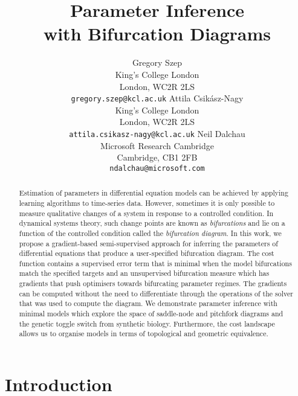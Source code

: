 

\title{Parameter Inference\\with Bifurcation Diagrams}
\author{
        Gregory Szep\\King's College London\\London, WC2R 2LS\\
        \texttt{gregory.szep@kcl.ac.uk}
    \And
        Attila Csik\'asz-Nagy\\King's College London\\London, WC2R 2LS\\
        \texttt{attila.csikasz-nagy@kcl.ac.uk}
    \And
        Neil Dalchau\\Microsoft Research Cambridge\\Cambridge, CB1 2FB\\
        \texttt{ndalchau@microsoft.com}
}



\maketitle
\begin{abstract}
    Estimation of parameters in differential equation models can be achieved by applying learning algorithms to time-series data. However, sometimes it is only possible to measure qualitative changes of a system in response to a controlled condition. In dynamical systems theory, such change points are known as \textit{bifurcations} and lie on a function of the controlled condition called the \textit{bifurcation diagram}. In this work, we propose a gradient-based semi-supervised approach for inferring the parameters of differential equations that produce a user-specified bifurcation diagram. The cost function contains a supervised error term that is minimal when the model bifurcations match the specified targets and an unsupervised bifurcation measure which has gradients that push optimisers towards bifurcating parameter regimes. The gradients can be computed without the need to differentiate through the operations of the solver that was used to compute the diagram. We demonstrate parameter inference with minimal models which explore the space of saddle-node and pitchfork diagrams and the genetic toggle switch from synthetic biology. Furthermore, the cost landscape allows us to organise models in terms of topological and geometric equivalence.
\end{abstract}


\section{Introduction}

